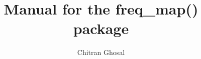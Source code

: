 \documentclass{scrbook}
\title{Manual for the freq\_map() package}
\author{Chitran Ghosal}
\begin{document}
	\maketitle
	\tableofcontents
	
	
	
	\begin{appendices}
		
	\end{appendices}
\end{document}
